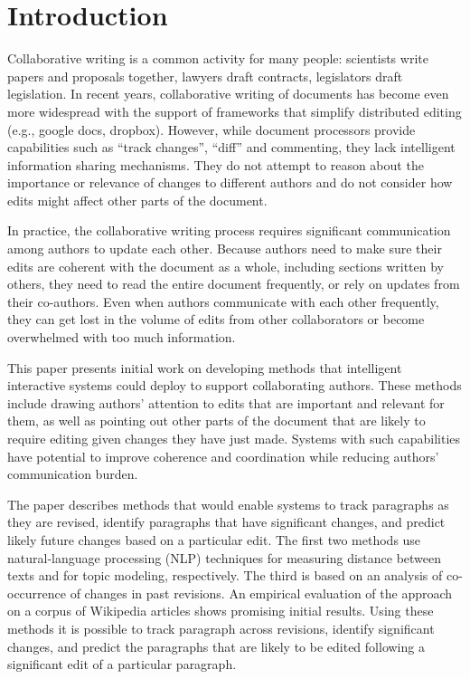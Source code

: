 \section{Introduction}\label{introduction}

Collaborative writing is a common activity for many people: scientists
write papers and proposals together, lawyers draft contracts,
legislators draft legislation. In recent years, collaborative writing of
documents has become even more widespread with the support of frameworks
that simplify distributed editing (e.g., google docs, dropbox). However,
while document processors provide capabilities such as ``track
changes'', ``diff'' and commenting, they lack intelligent information
sharing mechanisms. They do not attempt to reason about the importance
or relevance of changes to different authors and do not consider how
edits might affect other parts of the document.

In practice, the collaborative writing process requires significant
communication among authors to update each other. Because authors need
to make sure their edits are coherent with the document as a whole,
including sections written by others, they need to read the entire
document frequently, or rely on updates from their co-authors. Even when
authors communicate with each other frequently, they can get lost in the
volume of edits from other collaborators or become overwhelmed with too
much information.

This paper presents initial work on developing methods that intelligent
interactive systems could deploy to support collaborating authors. These
methods include drawing authors' attention to edits that are important
and relevant for them, as well as pointing out other parts of the
document that are likely to require editing given changes they have just
made. Systems with such capabilities have potential to improve coherence
and coordination while reducing authors' communication burden.

The paper describes methods that would enable systems to track
paragraphs as they are revised, identify paragraphs that have
significant changes, and predict likely future changes based on a
particular edit. The first two methods use natural-language processing
(NLP) techniques for measuring distance between texts and for topic
modeling, respectively. The third is based on an analysis of
co-occurrence of changes in past revisions. An empirical evaluation of
the approach on a corpus of Wikipedia articles shows promising initial
results. Using these methods it is possible to track paragraph across
revisions, identify significant changes, and predict the paragraphs that
are likely to be edited following a significant edit of a particular
paragraph.


